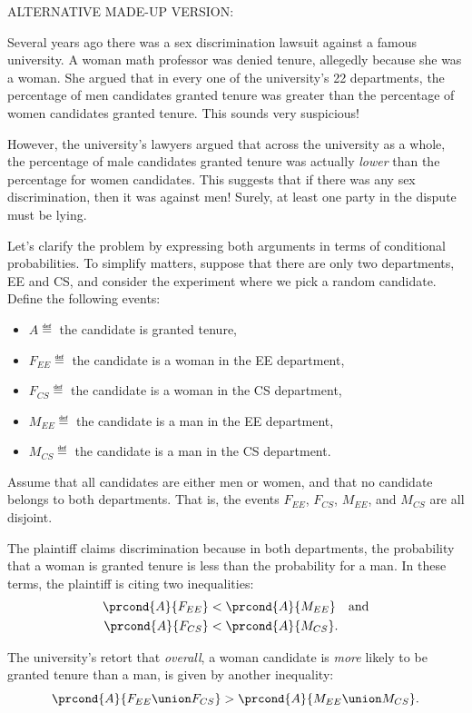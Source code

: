 \begin{editingnotes}
ALTERNATIVE MADE-UP VERSION:

Several years ago there was a sex discrimination lawsuit against a
famous university.  A woman math professor was denied tenure,
allegedly because she was a woman.  She argued that in every one of
the university's 22 departments, the percentage of men candidates
granted tenure was greater than the percentage of women candidates
granted tenure.  This sounds very suspicious!

However, the university's lawyers argued that across the university as
a whole, the percentage of male candidates granted tenure was actually
\emph{lower} than the percentage for women candidates.  This suggests
that if there was any sex discrimination, then it was against men!
Surely, at least one party in the dispute must be lying.

Let's clarify the problem by expressing both arguments in terms of
conditional probabilities.  To simplify matters, suppose that there
are only two departments, EE and CS, and consider the experiment where
we pick a random candidate.  Define the following events:
%
\begin{itemize}
\item $A \eqdef$ the candidate is granted tenure,
\item $F_{EE} \eqdef$ the candidate is a woman in the EE department,
\item $F_{CS} \eqdef$ the candidate is a woman in the CS department,
\item $M_{EE} \eqdef$ the candidate is a man in the EE department,
\item $M_{CS} \eqdef$ the candidate is a man in the CS department.
\end{itemize}

Assume that all candidates are either men or women, and that no
candidate belongs to both departments.  That is, the events $F_{EE}$,
$F_{CS}$, $M_{EE}$, and $M_{CS}$ are all disjoint.

The plaintiff claims discrimination because in both departments, the
probability that a woman is granted tenure is less than the
probability for a man.  In these terms, the plaintiff is citing two
inequalities:
\begin{align*}
\prcond{A}{F_{EE}} & < \prcond{A}{M_{EE}} \quad\text{and}\\
\prcond{A}{F_{CS}} & < \prcond{A}{M_{CS}}.
\end{align*}

The university's retort that \emph{overall}, a woman candidate is
\emph{more} likely to be granted tenure than a man, is given by
another inequality:
\[
    \prcond{A}{F_{EE} \union F_{CS}} > \prcond{A}{M_{EE} \union M_{CS}}.
\]


\end{editingnotes}
